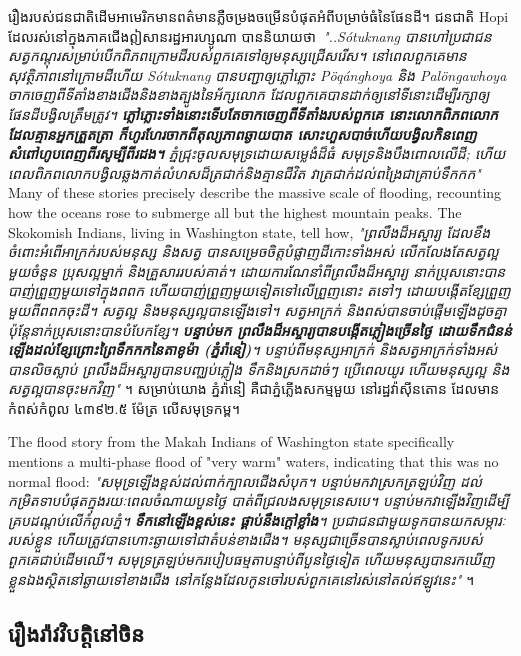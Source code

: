\documentclass[10pt,twocolumn,letterpaper]{article}
\begin{document}
រឿងរបស់ជនជាតិដើមអាមេរិកមានពត៌មានភ្លឺចម្រងចម្រើនបំផុតអំពីបម្រាច់ធំនៃផែនដី។ ជនជាតិ Hopi ដែលរស់នៅក្នុងភាគជើងឦសានរដ្ឋអារហ្សូណា បាននិយាយថា\, \textit{"..Sótuknang បានហៅប្រជាជនសត្វកណ្ដុរសម្រាប់បើកពិភពក្រោមដីរបស់ពួកគេទៅឲ្យមនុស្សជ្រើសរើស។ នៅពេលពួកគេមានសុវត្ថិភាពនៅក្រោមដីហើយ Sótuknang បានបញ្ជា​ឲ្យភ្លៅភ្លោះ Pöqánghoya និង Palöngawhoya ចាកចេញពីទីតាំងខាងជើងនិងខាងត្បូងនៃអ័ក្សលោក ដែលពួកគេបានដាក់ឲ្យនៅទីនោះដើម្បីរក្សាឲ្យផែនដីបង្វិលត្រឹមត្រូវ។ \textbf{ភ្លៅភ្លោះទាំងនោះទើបតែចាកចេញពីទីតាំងរបស់ពួកគេ នោះលោកពិភពលោកដែលគ្មានអ្នកត្រួតត្រា ក៏ហូរហែរចាកពីតុល្យភាពឆ្ងាយបាត សោះហួសបាច់ហើយបង្វិលកិនពេញសំពៅហូបពេញពីរសូម្បីពីរដង។} ភ្នំជ្រុះចូលសមុទ្រដោយសម្លេងំដ៏ធំ សមុទ្រនិងបឹងពោលលើដី; ហើយពេលពិភពលោកបង្វិលឆ្លងកាត់លំហសដ៏ត្រជាក់និងគ្មានជីវិត វាត្រជាក់ដល់ពង្រៃជាគ្រាប់ទឹកកក"} \cite{4}
Many of these stories precisely describe the massive scale of flooding, recounting how the oceans rose to submerge all but the highest mountain peaks. The Skokomish Indians, living in Washington state, tell how, \textit{"ព្រលឹងដ៏អស្ចារ្យ ដែលខឹងចំពោះអំពើអាក្រក់របស់មនុស្ស និងសត្វ បានសម្រេចចិត្តបំផ្លាញដីកោះទាំងអស់ លើកលែងតែសត្វល្អមួយចំនួន ប្រុសល្អម្នាក់ និងគ្រួសាររបស់គាត់។ ដោយការណែនាំពីព្រលឹងដ៏អស្ចារ្យ នាក់ប្រុសនោះបានបាញ់ព្រួញមួយទៅក្នុងពពក ហើយបាញ់ព្រួញមួយទៀតទៅលើព្រួញនោះ តទៅៗ ដោយបង្កើតខ្សែព្រួញមួយពីពពកចុះដី។ សត្វល្អ និងមនុស្សល្អបានឡើងទៅ។ សត្វអាក្រក់ និងពស់បានចាប់ផ្តើមឡើងដូចគ្នា ប៉ុន្តែនាក់ប្រុសនោះបានបំបែកខ្សែ។ \textbf{បន្ទាប់មក ព្រលឹងដ៏អស្ចារ្យបានបង្កើតភ្លៀងច្រើនថ្ងៃ ដោយទឹកជំនន់ឡើងដល់ខ្សែព្រោះព្រៃទឹកកកនៃតាខូម៉ា (ភ្នំរ៉ានៀ)}។ បន្ទាប់ពីមនុស្សអាក្រក់ និងសត្វអាក្រក់ទាំងអស់បានលិចស្លាប់ ព្រលឹងដ៏អស្ចារ្យបានបញ្ឈប់ភ្លៀង ទឹកនិងស្រកដាច់ៗ ប្រើពេលយូរ ហើយមនុស្សល្អ និងសត្វល្អបានចុះមកវិញ"} \cite{3}។ សម្រាប់យោង ភ្នំរ៉ានៀ គឺជាភ្នំភ្លើងសកម្មមួយ នៅរដ្ឋវ៉ាស៊ីនតោន ដែលមានកំពស់កំពូល ៤៣៩២.៥ ម៉ែត្រ លើសមុទ្រកម្ព។

The flood story from the Makah Indians of Washington state specifically mentions a multi-phase flood of "very warm" waters, indicating that this was no normal flood: \textit{"សមុទ្រឡើងខ្ពស់ដល់ពាក់ក្បាលជើងសំបុក។ បន្ទាប់មកវាស្រកត្រឡប់វិញ ដល់កម្រិតទាបបំផុតក្នុងរយៈពេលចំណាយបួនថ្ងៃ បាត់ពីជ្រលងសមុទ្រនេសបេ។ បន្ទាប់មកវាឡើងវិញដើម្បីគ្របដណ្តប់លើកំពូលភ្នំ។ \textbf{ទឹកនៅឡើងខ្ពស់នេះ ផ្គាប់នឹងក្តៅខ្លាំង}។ ប្រជាជនជាមួយទូកបានយកសម្ភារៈរបស់ខ្លួន ហើយត្រូវបានហោះឆ្ងាយទៅជាតំបន់ខាងជើង។ មនុស្សជាច្រើនបានស្លាប់ពេលទូករបស់ពួកគេជាប់ដើមឈើ។ សមុទ្រត្រឡប់មករបៀបធម្មតាបន្ទាប់ពីបួនថ្ងៃទៀត ហើយមនុស្សបានរកឃើញខ្លួនឯងស្ថិតនៅឆ្ងាយទៅខាងជើង នៅកន្លែងដែលកូនចៅរបស់ពួកគេនៅរស់នៅតល់ឥឡូវនេះ"} \cite{3}។

\subsection{រឿងរ៉ាវវិបត្តិនៅចិន}
\end{document}
